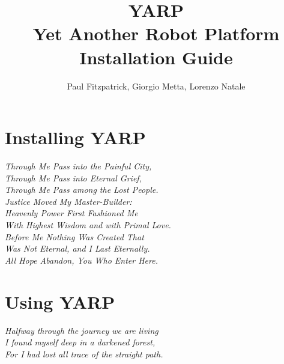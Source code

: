 \documentclass[a4paper]{report}
\begin{document}
\title{{\LARGE YARP}\\Yet Another Robot Platform\\
Installation Guide
}

\author{Paul Fitzpatrick, Giorgio Metta, Lorenzo Natale}

\addtolength{\hoffset}{1cm}
\maketitle
\thispagestyle{empty}
\newpage

\tableofcontents

\newpage
\chapter{Installing YARP}
\begin{flushright}
\textit{
          Through Me Pass into the Painful City, \\
          Through Me Pass into Eternal Grief, \\
          Through Me Pass among the Lost People. \\ 
          Justice Moved My Master-Builder: \\
          Heavenly Power First Fashioned Me \\
          With Highest Wisdom and with Primal Love. \\
          Before Me Nothing Was Created That  \\
          Was Not Eternal, and I Last Eternally. \\ 
          All Hope Abandon, You Who Enter Here. \\
        }
\end{flushright}

\newpage
\addtolength{\hoffset}{-1cm}




\newpage
\chapter{Using YARP}
\begin{flushright}
\textit{
					Halfway through the journey we are living \\
          I found myself deep in a darkened forest, \\
          For I had lost all trace of the straight path. \\
       }
\end{flushright}
\addtolength{\hoffset}{1cm}
\end{document}
